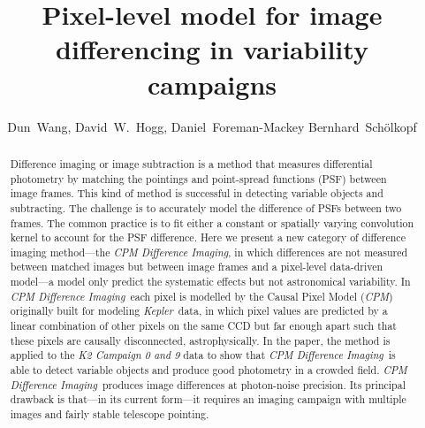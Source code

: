 \documentclass[12pt, preprint]{aastex}
\newcommand{\project}[1]{\textsl{#1}}
\newcommand{\cpm}{\project{CPM}}
\newcommand{\cpmdiff}{\project{CPM Difference Imaging}}
\newcommand{\kepler}{\project{Kepler}}
\begin{document}
\title{Pixel-level model for image differencing in variability campaigns}
\author{%
  Dun~Wang\altaffilmark{\ref{CCPP}},
  David~W.~Hogg\altaffilmark{\ref{CCPP},\ref{CDS},\ref{MPIA},\ref{email}},
  Daniel~Foreman-Mackey\altaffilmark{\ref{UW},\ref{SF}}
  Bernhard~Sch\"olkopf\altaffilmark{\ref{MPIIS}}
  }
\setcounter{address}{1}


\begin{abstract}
Difference imaging or image subtraction is a method that measures differential photometry by matching the pointings and point-spread functions (PSF) between image frames. 
This kind of method is successful in detecting variable objects and subtracting. The challenge is to accurately model the difference of PSFs between two frames. The common practice is to fit either a constant or spatially varying convolution kernel to account for the PSF difference.
Here we present a new category of difference imaging method---the \cpmdiff, in which differences are not measured between matched images but between image frames and a pixel-level data-driven model---a model only predict the systematic effects but not astronomical variability. 
In \cpmdiff\ each pixel is modelled by the Causal Pixel Model (\cpm) originally built for modeling \kepler\ data, in which pixel values are predicted by a linear combination of other pixels on the same CCD but far enough apart such that these pixels are causally disconnected, astrophysically. 
In the paper, the method is applied to the \project{K2 Campaign 0 and 9} data to show that \cpmdiff\ is able to detect variable objects and produce good photometry in a crowded field.
\cpmdiff\ produces image differences at photon-noise precision. 
Its principal drawback is that---in its current form---it requires an imaging campaign with multiple images and fairly stable telescope pointing.

\end{abstract}
\end{document}
